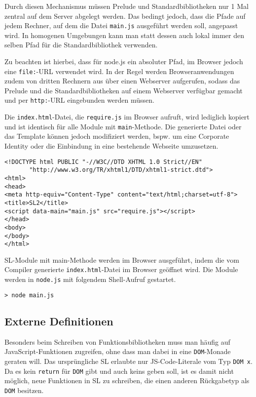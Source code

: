 \documentclass[runningheads]{llncs}
\begin{document}
Durch diesen Mechanismus müssen Prelude und Standardbibliotheken nur
1 Mal zentral auf dem Server abgelegt werden. Das bedingt jedoch, dass
die Pfade auf jedem Rechner, auf dem die Datei \texttt{main.js}
ausgeführt werden soll, angepasst wird. In homogenen Umgebungen kann
man statt dessen auch lokal immer den selben Pfad für die
Standardbibliothek verwenden.

Zu beachten ist hierbei, dass für node.js ein absoluter Pfad, im Browser jedoch
eine \texttt{file:}-URL verwendet wird. In der Regel werden
Browseranwendungen zudem von dritten Rechnern aus über einen Webserver
aufgerufen, sodass das Prelude und die Standardbibliotheken auf einem
Webserver verfügbar gemacht und per \texttt{http:}-URL eingebunden
werden müssen.

Die \texttt{index.html}-Datei, die \texttt{require.js} im Browser
aufruft, wird lediglich kopiert und ist identisch für alle Module
mit \texttt{main}-Methode. Die generierte Datei oder das Template
können jedoch modifiziert werden, bspw. um eine Corporate Identity
oder die Einbindung in eine bestehende Webseite umzusetzen.

\begin{verbatim}
<!DOCTYPE html PUBLIC "-//W3C//DTD XHTML 1.0 Strict//EN"
       "http://www.w3.org/TR/xhtml1/DTD/xhtml1-strict.dtd">
<html>
<head>
<meta http-equiv="Content-Type" content="text/html;charset=utf-8">
<title>SL2</title>
<script data-main="main.js" src="require.js"></script>
</head>
<body>
</body>
</html>
\end{verbatim}

SL-Module mit main-Methode werden im Browser ausgeführt, indem die
vom Compiler generierte \texttt{index.html}-Datei im Browser geöffnet
wird. Die Module werden in \texttt{node.js} mit folgendem Shell-Aufruf
gestartet.

\begin{verbatim}
> node main.js
\end{verbatim}

\subsection{Externe Definitionen}

Besonders beim Schreiben von Funktionsbibliotheken muss man häufig auf
Java\-Script-Funktionen zugreifen, ohne dass man dabei in eine
\verb|DOM|-Monade geraten will. Das ursprüngliche SL erlaubte nur
JS-Code-Literale vom Typ \verb|DOM x|. Da es kein \verb|return| für
\verb|DOM| gibt und auch keins geben soll, ist es damit nicht möglich,
neue Funktionen in SL zu schreiben, die einen anderen Rückgabetyp als
\verb|DOM| besitzen.
\end{document}

